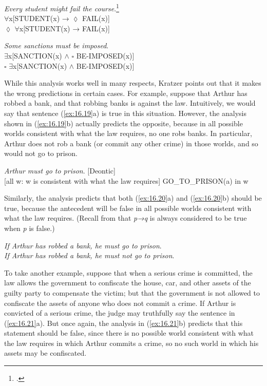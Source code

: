\ea \label{ex:16.17}
\textit{Every student might fail the course}.\footnote{\citet[48]{Abbott2010}.}\\
\ea  ${\forall}$x[STUDENT(x) → ${\lozenge}$ FAIL(x)]\\
\ex ${\lozenge}$ ${\forall}$x[STUDENT(x) → FAIL(x)]
                       \z
\z

\ea \label{ex:16.18}
\textit{Some sanctions must be imposed}.\\
\ea  ${\exists}$x[SANCTION(x) $\wedge$ ${\square}$ BE-IMPOSED(x)]\\
\ex ${\square}$ ${\exists}$x[SANCTION(x) $\wedge$ BE-IMPOSED(x)]
                       \z
\z


While this analysis works well in many respects, Kratzer points out that it makes the wrong predictions in certain cases. For example, suppose that Arthur has robbed a bank, and that robbing banks is against the law. Intuitively, we would say that sentence (\ref{ex:16.19}a) is true in this situation. However, the analysis shown in (\ref{ex:16.19}b) actually predicts the opposite, because in all possible worlds consistent with what the law requires, no one robs banks. In particular, Arthur does not rob a bank (or commit any other crime) in those worlds, and so would not go to prison.


\ea \label{ex:16.19}
\ea  \textit{Arthur must go to prison}. \hfill [Deontic]\\
\ex{} [all w: w is consistent with what the law requires] GO\_TO\_PRISON(a) in w
                       \z
\z


Similarly, the analysis predicts that both (\ref{ex:16.20}a) and (\ref{ex:16.20}b) should be true, because the antecedent will be false in all possible worlds consistent with what the law requires. (Recall from  that \textit{p→q} is always considered to be true when \textit{p} is false.)


\largerpage
\ea \label{ex:16.20}
\ea  \textit{If Arthur has robbed a bank, he} \textit{must go to prison}.\\
\ex \textit{If Arthur has robbed a bank, he} \textit{must not go to prison}.
                       \z
\z

To take another example, suppose that when a serious crime is committed, the law allows the government to confiscate the house, car, and other assets of the guilty party to compensate the victim; but that the government is not allowed to confiscate the assets of anyone who does not commit a crime. If Arthur is convicted of a serious crime, the judge may truthfully say the sentence in (\ref{ex:16.21}a). But once again, the analysis in (\ref{ex:16.21}b) predicts that this statement should be false, since there is no possible world consistent with what the law requires in which Arthur commits a crime, so no such world in which his assets may be confiscated.


